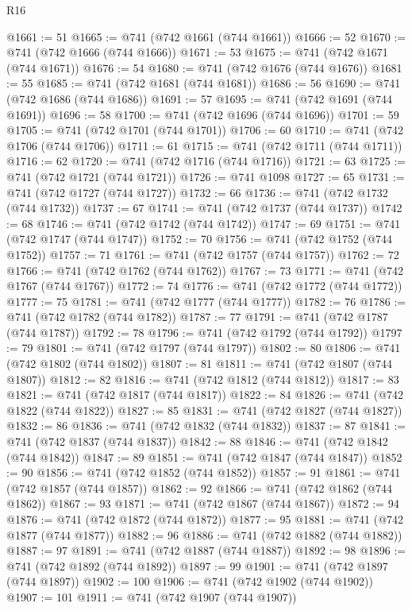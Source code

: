 \begin{lexlean}{R16}
\begin{coremodule}
@1661 := 51
@1665 := @741 (@742 @1661 (@744 @1661))
@1666 := 52
@1670 := @741 (@742 @1666 (@744 @1666))
@1671 := 53
@1675 := @741 (@742 @1671 (@744 @1671))
@1676 := 54
@1680 := @741 (@742 @1676 (@744 @1676))
@1681 := 55
@1685 := @741 (@742 @1681 (@744 @1681))
@1686 := 56
@1690 := @741 (@742 @1686 (@744 @1686))
@1691 := 57
@1695 := @741 (@742 @1691 (@744 @1691))
@1696 := 58
@1700 := @741 (@742 @1696 (@744 @1696))
@1701 := 59
@1705 := @741 (@742 @1701 (@744 @1701))
@1706 := 60
@1710 := @741 (@742 @1706 (@744 @1706))
@1711 := 61
@1715 := @741 (@742 @1711 (@744 @1711))
@1716 := 62
@1720 := @741 (@742 @1716 (@744 @1716))
@1721 := 63
@1725 := @741 (@742 @1721 (@744 @1721))
@1726 := @741 @1098
@1727 := 65
@1731 := @741 (@742 @1727 (@744 @1727))
@1732 := 66
@1736 := @741 (@742 @1732 (@744 @1732))
@1737 := 67
@1741 := @741 (@742 @1737 (@744 @1737))
@1742 := 68
@1746 := @741 (@742 @1742 (@744 @1742))
@1747 := 69
@1751 := @741 (@742 @1747 (@744 @1747))
@1752 := 70
@1756 := @741 (@742 @1752 (@744 @1752))
@1757 := 71
@1761 := @741 (@742 @1757 (@744 @1757))
@1762 := 72
@1766 := @741 (@742 @1762 (@744 @1762))
@1767 := 73
@1771 := @741 (@742 @1767 (@744 @1767))
@1772 := 74
@1776 := @741 (@742 @1772 (@744 @1772))
@1777 := 75
@1781 := @741 (@742 @1777 (@744 @1777))
@1782 := 76
@1786 := @741 (@742 @1782 (@744 @1782))
@1787 := 77
@1791 := @741 (@742 @1787 (@744 @1787))
@1792 := 78
@1796 := @741 (@742 @1792 (@744 @1792))
@1797 := 79
@1801 := @741 (@742 @1797 (@744 @1797))
@1802 := 80
@1806 := @741 (@742 @1802 (@744 @1802))
@1807 := 81
@1811 := @741 (@742 @1807 (@744 @1807))
@1812 := 82
@1816 := @741 (@742 @1812 (@744 @1812))
@1817 := 83
@1821 := @741 (@742 @1817 (@744 @1817))
@1822 := 84
@1826 := @741 (@742 @1822 (@744 @1822))
@1827 := 85
@1831 := @741 (@742 @1827 (@744 @1827))
@1832 := 86
@1836 := @741 (@742 @1832 (@744 @1832))
@1837 := 87
@1841 := @741 (@742 @1837 (@744 @1837))
@1842 := 88
@1846 := @741 (@742 @1842 (@744 @1842))
@1847 := 89
@1851 := @741 (@742 @1847 (@744 @1847))
@1852 := 90
@1856 := @741 (@742 @1852 (@744 @1852))
@1857 := 91
@1861 := @741 (@742 @1857 (@744 @1857))
@1862 := 92
@1866 := @741 (@742 @1862 (@744 @1862))
@1867 := 93
@1871 := @741 (@742 @1867 (@744 @1867))
@1872 := 94
@1876 := @741 (@742 @1872 (@744 @1872))
@1877 := 95
@1881 := @741 (@742 @1877 (@744 @1877))
@1882 := 96
@1886 := @741 (@742 @1882 (@744 @1882))
@1887 := 97
@1891 := @741 (@742 @1887 (@744 @1887))
@1892 := 98
@1896 := @741 (@742 @1892 (@744 @1892))
@1897 := 99
@1901 := @741 (@742 @1897 (@744 @1897))
@1902 := 100
@1906 := @741 (@742 @1902 (@744 @1902))
@1907 := 101
@1911 := @741 (@742 @1907 (@744 @1907))

\end{coremodule}
\end{lexlean}
